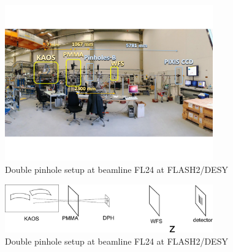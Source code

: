 \documentclass{osa-article}
\begin{document}
\begin{figure}[htbp]
    \centering
    \includegraphics[width=0.8\textwidth]{gfx/setup_sketch_with_photo.pdf}
    \caption{Double pinhole setup at beamline FL24 at FLASH2/DESY}
    \label{fig:DPH_setup}
\end{figure}

\begin{figure}[htbp]
    \centering
    \includegraphics[width=0.8\textwidth]{gfx/sketch_dph_setup.pdf}
    \caption{Double pinhole setup at beamline FL24 at FLASH2/DESY}
    \label{fig:DPH_setup}
\end{figure}
\end{document}
